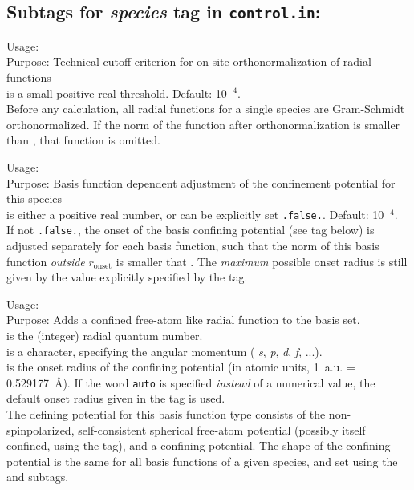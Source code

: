 \newpage

\subsection*{Subtags for \emph{species} tag in \texttt{control.in}:}

{
  \noindent
  Usage:   \\[1.0ex]
  Purpose: Technical cutoff criterion for on-site orthonormalization
    of radial functions \\[1.0ex]
   is a small positive real threshold. Default:
  10$^{-4}$. \\
}
Before any calculation, all radial functions for a single species are
Gram-Schmidt orthonormalized. If the norm of the function after
  orthonormalization is smaller than , that function
  is omitted.

{
  \noindent
  Usage:   \\[1.0ex]
  Purpose: Basis function dependent adjustment of the confinement
  potential for this species \\[1.0ex]
   is either a positive real number, or can be
  explicitly set \texttt{.false.}. Default: 10$^{-4}$. \\
}
If not \texttt{.false.}, the onset of the basis confining potential
(see  tag below) is adjusted separately
  for each basis function, such that the norm of this basis function
  \emph{outside} $r_\text{onset}$ is smaller that
  . The \emph{maximum} possible onset radius is
  still given by the value explicitly specified by the
   tag. 

{
  \noindent
  Usage:   
     \\[1.0ex]
  Purpose: Adds a confined free-atom like radial function to the basis
    set. \\[1.0ex]
   is the (integer) radial quantum number. \\
   is a character, specifying the angular momentum (
    \emph{s}, \emph{p}, \emph{d}, \emph{f}, ...). \\
   is the onset radius of the confining potential
    (in atomic units, 1~a.u. = 0.529177~\AA). If the word
    \texttt{auto} is specified \emph{instead} of a numerical value,
    the default onset radius given in the
     tag is used. \\
}
The defining potential for this basis function type consists of the
non-spinpolarized, self-consistent spherical free-atom potential
(possibly itself confined, using the
 tag), and a confining
potential. The shape of the confining potential is the same for all
basis functions of a given species, and set using the
 and  
subtags. 

